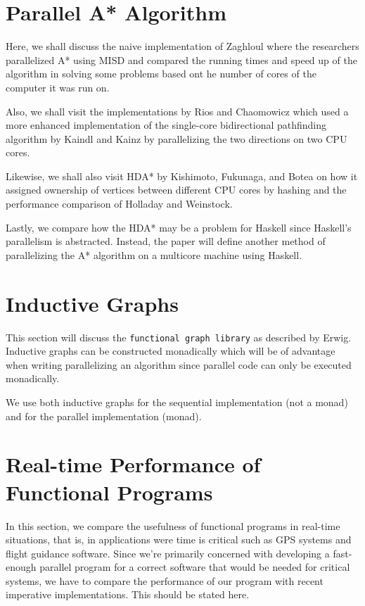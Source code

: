 \section{Parallel A* Algorithm}
Here, we shall discuss the naive implementation of Zaghloul\cite{ZaghloulAlJami2017}
where the researchers parallelized A* using MISD and compared the running times and speed up 
of the algorithm in solving some problems based ont he number of cores of the computer it was run on.

Also, we shall visit the implementations by Rios and Chaomowicz\cite{Rios2011}
which used a more enhanced implementation of the single-core bidirectional pathfinding algorithm by 
Kaindl and Kainz\cite{KainlKainz1997} by parallelizing the two directions on two CPU cores.

Likewise, we shall also visit HDA* by Kishimoto, Fukunaga, and Botea\cite{Kishimoto2009} on how it 
assigned ownership of vertices between different CPU cores by hashing and the performance comparison of
Holladay and Weinstock\cite{WeinstockHolladay}.

Lastly, we compare how the HDA* may be a problem for Haskell since 
Haskell's parallelism is abstracted. Instead, the paper will define 
another method of parallelizing the A* algorithm on a multicore machine 
using Haskell.

\section{Inductive Graphs}
This section will discuss the \verb|functional graph library| as described by Erwig.\cite{Erwig2001}
Inductive graphs can be constructed monadically which will be of advantage when writing 
parallelizing an algorithm since parallel code can only be executed monadically.

We use both inductive graphs for the sequential implementation (not a monad) and for the parallel
implementation (monad).

\section{Real-time Performance of Functional Programs}
In this section, we compare the usefulness of functional programs in real-time situations, that is, in 
applications were time is critical such as GPS systems and flight guidance software.\cite{Frame2014}
Since we're primarily concerned with developing a fast-enough parallel program for a correct software that 
would be needed for critical systems, we have to compare the performance of our program with recent imperative 
implementations. This should be stated here.


